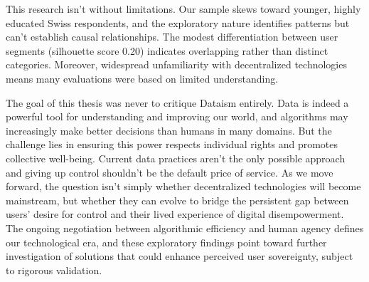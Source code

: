 This research isn't without limitations. Our sample skews toward younger, highly educated Swiss respondents, and the exploratory nature identifies patterns but can't establish causal relationships. The modest differentiation between user segments (silhouette score 0.20) indicates overlapping rather than distinct categories. Moreover, widespread unfamiliarity with decentralized technologies means many evaluations were based on limited understanding.

The goal of this thesis was never to critique Dataism entirely. Data is indeed a powerful tool for understanding and improving our world, and algorithms may increasingly make better decisions than humans in many domains. But the challenge lies in ensuring this power respects individual rights and promotes collective well-being. Current data practices aren't the only possible approach and giving up control shouldn't be the default price of service. As we move forward, the question isn't simply whether decentralized technologies will become mainstream, but whether they can evolve to bridge the persistent gap between users' desire for control and their lived experience of digital disempowerment. The ongoing negotiation between algorithmic efficiency and human agency defines our technological era, and these exploratory findings point toward further investigation of solutions that could enhance perceived user sovereignty, subject to rigorous validation.
